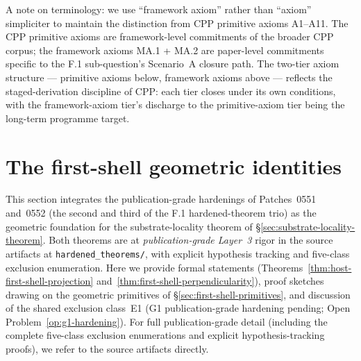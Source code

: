 \documentclass[11pt,letterpaper]{article}
\begin{document}
A note on terminology: we use ``framework axiom'' rather than ``axiom'' simpliciter to maintain the distinction from CPP primitive axioms A1--A11. The CPP primitive axioms are framework-level commitments of the broader CPP corpus; the framework axioms MA.1 + MA.2 are paper-level commitments specific to the F.1 sub-question's Scenario~A closure path. The two-tier axiom structure --- primitive axioms below, framework axioms above --- reflects the staged-derivation discipline of CPP: each tier closes under its own conditions, with the framework-axiom tier's discharge to the primitive-axiom tier being the long-term programme target.

\section{The first-shell geometric identities}
\label{sec:first-shell-identities}


This section integrates the publication-grade hardenings of Patches~0551 and~0552 (the second and third of the F.1 hardened-theorem trio) as the geometric foundation for the substrate-locality theorem of \S\ref{sec:substrate-locality-theorem}. Both theorems are at \emph{publication-grade Layer~3} rigor in the source artifacts at \texttt{hardened\_theorems/}, with explicit hypothesis tracking and five-class exclusion enumeration. Here we provide formal statements (Theorems~\ref{thm:host-first-shell-projection} and~\ref{thm:first-shell-perpendicularity}), proof sketches drawing on the geometric primitives of \S\ref{sec:first-shell-primitives}, and discussion of the shared exclusion class~E1 (G1 publication-grade hardening pending; Open Problem~\ref{op:g1-hardening}). For full publication-grade detail (including the complete five-class exclusion enumerations and explicit hypothesis-tracking proofs), we refer to the source artifacts directly.
\end{document}
